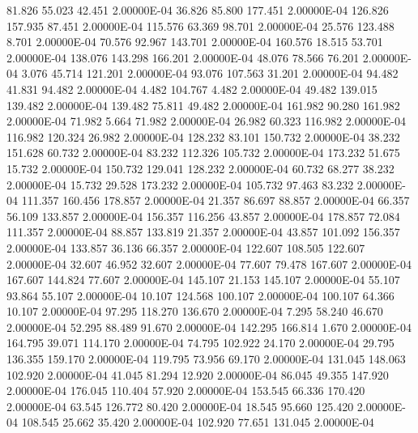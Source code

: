     81.826    55.023    42.451  2.00000E-04
    36.826    85.800   177.451  2.00000E-04
   126.826   157.935    87.451  2.00000E-04
   115.576    63.369    98.701  2.00000E-04
    25.576   123.488     8.701  2.00000E-04
    70.576    92.967   143.701  2.00000E-04
   160.576    18.515    53.701  2.00000E-04
   138.076   143.298   166.201  2.00000E-04
    48.076    78.566    76.201  2.00000E-04
     3.076    45.714   121.201  2.00000E-04
    93.076   107.563    31.201  2.00000E-04
    94.482    41.831    94.482  2.00000E-04
     4.482   104.767     4.482  2.00000E-04
    49.482   139.015   139.482  2.00000E-04
   139.482    75.811    49.482  2.00000E-04
   161.982    90.280   161.982  2.00000E-04
    71.982     5.664    71.982  2.00000E-04
    26.982    60.323   116.982  2.00000E-04
   116.982   120.324    26.982  2.00000E-04
   128.232    83.101   150.732  2.00000E-04
    38.232   151.628    60.732  2.00000E-04
    83.232   112.326   105.732  2.00000E-04
   173.232    51.675    15.732  2.00000E-04
   150.732   129.041   128.232  2.00000E-04
    60.732    68.277    38.232  2.00000E-04
    15.732    29.528   173.232  2.00000E-04
   105.732    97.463    83.232  2.00000E-04
   111.357   160.456   178.857  2.00000E-04
    21.357    86.697    88.857  2.00000E-04
    66.357    56.109   133.857  2.00000E-04
   156.357   116.256    43.857  2.00000E-04
   178.857    72.084   111.357  2.00000E-04
    88.857   133.819    21.357  2.00000E-04
    43.857   101.092   156.357  2.00000E-04
   133.857    36.136    66.357  2.00000E-04
   122.607   108.505   122.607  2.00000E-04
    32.607    46.952    32.607  2.00000E-04
    77.607    79.478   167.607  2.00000E-04
   167.607   144.824    77.607  2.00000E-04
   145.107    21.153   145.107  2.00000E-04
    55.107    93.864    55.107  2.00000E-04
    10.107   124.568   100.107  2.00000E-04
   100.107    64.366    10.107  2.00000E-04
    97.295   118.270   136.670  2.00000E-04
     7.295    58.240    46.670  2.00000E-04
    52.295    88.489    91.670  2.00000E-04
   142.295   166.814     1.670  2.00000E-04
   164.795    39.071   114.170  2.00000E-04
    74.795   102.922    24.170  2.00000E-04
    29.795   136.355   159.170  2.00000E-04
   119.795    73.956    69.170  2.00000E-04
   131.045   148.063   102.920  2.00000E-04
    41.045    81.294    12.920  2.00000E-04
    86.045    49.355   147.920  2.00000E-04
   176.045   110.404    57.920  2.00000E-04
   153.545    66.336   170.420  2.00000E-04
    63.545   126.772    80.420  2.00000E-04
    18.545    95.660   125.420  2.00000E-04
   108.545    25.662    35.420  2.00000E-04
   102.920    77.651   131.045  2.00000E-04

